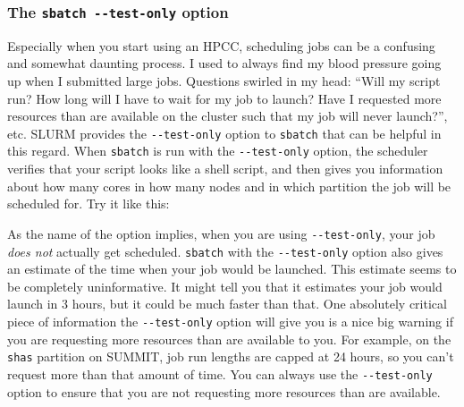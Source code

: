 \documentclass[]{krantz}
\makeatletter
\newenvironment{Shaded}{\begin{snugshade}}{\end{snugshade}}
\newcommand{\CommentTok}[1]{\textcolor[rgb]{0.37,0.37,0.37}{\textit{#1}}}
\newcommand{\ExtensionTok}[1]{#1}
\newcommand{\NormalTok}[1]{#1}
\newenvironment{kframe}{%
\medskip{}
\setlength{\fboxsep}{.8em}
 \def\at@end@of@kframe{}%
 \ifinner\ifhmode%
  \def\at@end@of@kframe{\end{minipage}}%
  \begin{minipage}{\columnwidth}%
 \fi\fi%
 \def\FrameCommand##1{\hskip\@totalleftmargin \hskip-\fboxsep
 \colorbox{shadecolor}{##1}\hskip-\fboxsep
     \hskip-\linewidth \hskip-\@totalleftmargin \hskip\columnwidth}%
 \MakeFramed {\advance\hsize-\width
   \@totalleftmargin\z@ \linewidth\hsize
   \@setminipage}}%
 {\par\unskip\endMakeFramed%
 \at@end@of@kframe}
\renewenvironment{Shaded}{\begin{kframe}}{\end{kframe}}
\makeatother
\begin{document}
\hypertarget{the-sbatch---test-only-option}{%
\subsubsection{\texorpdfstring{The \texttt{sbatch\ -\/-test-only} option}{The sbatch -\/-test-only option}}\label{the-sbatch---test-only-option}}

Especially when you start using an HPCC, scheduling jobs can be a confusing and somewhat
daunting process. I used to always find my blood pressure going up when I submitted large
jobs. Questions swirled in my head: ``Will my script run? How long will I have to wait
for my job to launch? Have I requested more resources than are available on the cluster
such that my job will never launch?'', etc. SLURM provides the \texttt{-\/-test-only} option to
\texttt{sbatch} that can be helpful in this regard. When \texttt{sbatch} is run with the \texttt{-\/-test-only} option,
the scheduler verifies that your script looks like a shell script, and then gives you information
about how many cores in how many nodes and in which partition the job will be scheduled for.
Try it like this:

\begin{Shaded}
\end{Shaded}

As the name of the option implies, when you are using \texttt{-\/-test-only}, your job \emph{does not}
actually get scheduled.
\texttt{sbatch} with the \texttt{-\/-test-only} option also gives an estimate of the time
when your job would be launched. This estimate seems to
be completely uninformative. It might tell you that it estimates your job would launch in
3 hours, but it could be much faster than that. One absolutely critical piece of information the
\texttt{-\/-test-only} option will give you is a nice big warning if you are requesting more resources than
are available to you. For example, on the \texttt{shas} partition on SUMMIT, job run lengths are
capped at 24 hours, so you can't request more than that amount of time. You can always use the \texttt{-\/-test-only} option to
ensure that you are not requesting more resources than are available.
\end{document}
